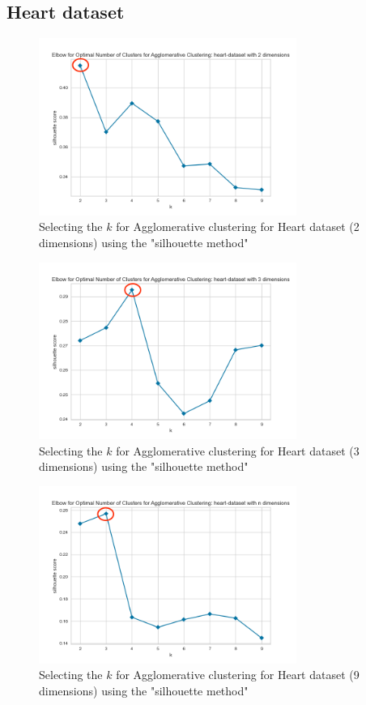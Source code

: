 \subsection{Heart dataset}
\begin{figure}[H]
  \includegraphics[width=0.75\textwidth]{Method/images/k-values/heart-dataset-2-agglomerative.png}
  \caption{Selecting the $k$ for Agglomerative clustering for Heart dataset (2 dimensions) using the "silhouette method"}
  \label{hyperparameters:agglomerative-heart-dataset-2d}
\end{figure}
\begin{figure}[H]
  \includegraphics[width=0.75\textwidth]{Method/images/k-values/heart-dataset-3-agglomerative.png}
  \caption{Selecting the $k$ for Agglomerative clustering for Heart dataset (3 dimensions) using the "silhouette method"}
  \label{hyperparameters:agglomerative-heart-dataset-3d}
\end{figure}
\begin{figure}[H]
  \includegraphics[width=0.75\textwidth]{Method/images/k-values/heart-dataset-n-agglomerative.png}
  \caption{Selecting the $k$ for Agglomerative clustering for Heart dataset (9 dimensions) using the "silhouette method"}
  \label{hyperparameters:agglomerative-heart-dataset-9d}
\end{figure}
\newpage

